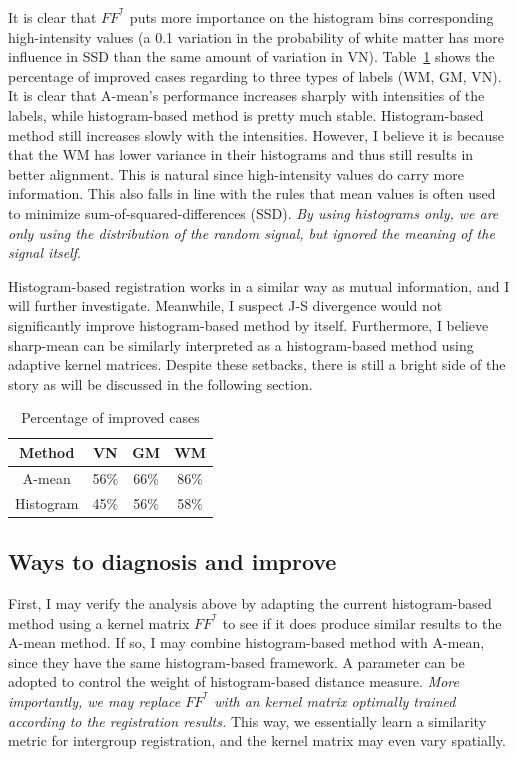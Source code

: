 \documentclass[preprint,review,12pt]{elsarticle}
\def\Transpose{{^\mathsf{T}}}
\begin{document}
It is clear that $F F^\Transpose$ puts more importance on the histogram bins corresponding high-intensity values (a 0.1 variation in the probability of white matter has more influence in SSD than the same amount of variation in VN). Table~\ref{tb:percentage} shows the percentage of improved cases regarding to three types of labels (WM, GM, VN). It is clear that A-mean's performance increases sharply with intensities of the labels, while histogram-based method is pretty much stable. Histogram-based method still increases slowly with the intensities. However, I believe it is because that the WM has lower variance in their histograms and thus still results in better alignment.
This is natural since high-intensity values do carry more information. This also falls in line with the rules that mean values is often used to minimize sum-of-squared-differences (SSD). \emph{By using histograms only, we are only using the distribution of the random signal, but ignored the meaning of the signal itself}. 

Histogram-based registration works in a similar way as mutual information, and I will further investigate. Meanwhile, I suspect J-S divergence would not significantly improve histogram-based method by itself. Furthermore, I believe sharp-mean can be similarly interpreted as a histogram-based method using adaptive kernel matrices.
Despite these setbacks, there is still a bright side of the story as will be discussed in the following section.
\begin{table}[thb]
	\caption{Percentage of improved cases}
	\begin{center}
		\label{tb:percentage}
		\begin{tabular*}{0.90\textwidth}{@{\extracolsep{\fill}}cccc}
			\toprule
			Method 	& VN & GM & WM \\
			\midrule
			A-mean  & 56\% & 66\% & 86\% \\
			Histogram & 45\% & 56\%   &58\% \\
			\bottomrule
		\end{tabular*}	
	\end{center}
\end{table}


\subsection{Ways to diagnosis and improve}

First, I may verify the analysis above by adapting the current histogram-based method using a kernel matrix $F F^\Transpose$ to see if it does produce similar results to the A-mean method. If so, I may combine histogram-based method with A-mean, since they have the same histogram-based framework. A parameter can be adopted to control the weight of histogram-based distance measure.
{\it More importantly, we may replace $F F^\Transpose$ with an kernel matrix optimally trained according to the registration results.} This way, we essentially learn a similarity metric for intergroup registration, and the kernel matrix may even vary spatially.
\end{document}
